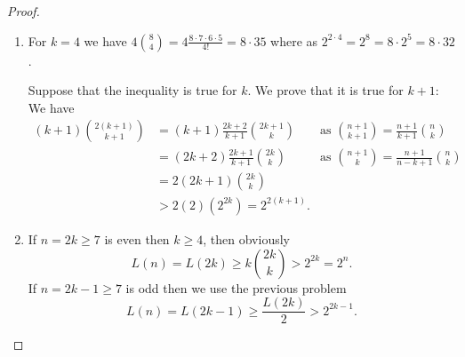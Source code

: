 \documentclass[12pt]{article}
\begin{document}
\begin{proof}
\begin{enumerate}
\item For $k = 4$ we have $4 \binom{8}{4} = 4 \frac{8 \cdot 7 \cdot 6 \cdot 5}{4!} = 8 \cdot 35$ where as $2^{2 \cdot 4} = 2^8 = 8 \cdot 2^5 = 8 \cdot 32$.

Suppose that the inequality is true for $k$. We prove that it is true for $k + 1$: We have
\begin{align*}
(k+1) \binom{2(k+1)}{k+1} &= (k+1) \frac{2k+2}{k+1} \binom{2k+1}{k} &\text{as } \binom{n+1}{k+1} = \frac{n+1}{k+1} \binom{n}{k}\\
&= (2k+2) \frac{2k+1}{k+1} \binom{2k}{k} &\text{as } \binom{n+1}{k} = \frac{n+1}{n-k+1} \binom{n}{k}\\
&= 2 (2k+1) \binom{2k}{k}\\
&> 2 (2) (2^{2k}) = 2^{2(k+1)}.
\end{align*}

\item If $n = 2k \geq 7$ is even then $k \geq 4$, then obviously
$$L(n) = L(2k) \geq k\binom{2k}{k} > 2^{2k} = 2^n.$$
If $n = 2k - 1 \geq 7$ is odd then we use the previous problem
$$L(n) = L(2k-1) \geq \frac{L(2k)}{2} > 2^{2k - 1}.$$
\end{enumerate}
\end{proof}

\unless\ifdefined\IsMainDocument
\end{document}

